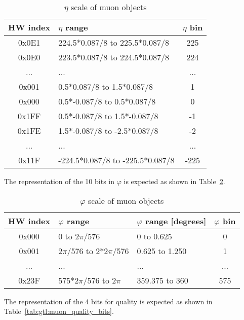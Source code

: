 \begin{table}
\caption{$\eta$ scale of muon objects}
\vspace{5mm}
\centering
\begin{tabular}{|c|l|c|}\hline
HW index & $\eta$ range & $\eta$ bin\\\hline\hline
0x0E1 & 224.5$*$0.087/8 to 225.5$*$0.087/8 & 225\\\hline
0x0E0 & 223.5$*$0.087/8 to 224.5$*$0.087/8 & 224\\\hline
... & ... & ...\\\hline
0x001 & 0.5$*$0.087/8 to 1.5$*$0.087/8 & 1\\\hline
0x000 & 0.5$*$-0.087/8 to 0.5$*$0.087/8 & 0\\\hline
0x1FF & 0.5$*$-0.087/8 to 1.5$*$-0.087/8 & -1\\\hline
0x1FE & 1.5$*$-0.087/8 to -2.5$*$0.087/8 & -2\\\hline
... & ... & ...\\\hline
0x11F & -224.5$*$0.087/8 to -225.5$*$0.087/8 & -225\\\hline
\end{tabular}
\label{tab:gtl:muon_eta_scale}
\end{table}

The representation of the 10 bits in $\varphi$ is expected as shown in Table~\ref{tab:gtl:muon_phi_scale}.\\

\begin{table}[ht]
\caption{$\varphi$ scale of muon objects}
\vspace{5mm}
\centering
\begin{tabular}{|c|l|l|c|}\hline
HW index & $\varphi$ range & $\varphi$ range [degrees] & $\varphi$ bin\\\hline\hline
0x000 & 0 to 2$\pi$/576 & 0 to 0.625 & 0\\\hline
0x001 & 2$\pi$/576 to 2$*$2$\pi$/576 & 0.625 to 1.250 & 1\\\hline
... & ... & ... & ...\\\hline
0x23F & 575$*$2$\pi$/576 to 2$\pi$ & 359.375 to 360 & 575\\\hline
\end{tabular}
\label{tab:gtl:muon_phi_scale}
\end{table}

The representation of the 4 bits for quality is expected as shown in Table~\ref{tab:gtl:muon_quality_bits}.\\

